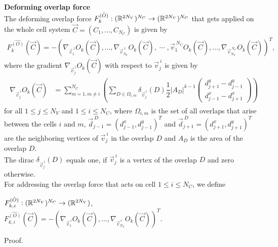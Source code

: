 \begin{proposition} \textbf{Deforming overlap force} \\
	The deforming overlap force $F_{k}^{\hat{(O)}}: (\mathbb{R}^{2 N_V})^{N_C} \rightarrow (\mathbb{R}^{2 N_V})^{N_C}$ that gets applied on the whole cell system $\vec{C} = (C_1, \ldots, C_{N_C})$ is given by  
	\begin{align*}
		F_{k}^{\hat{(O)}}(\vec{C}) 
		= - (\nabla_{\vec{v}_1^{\:1}} O_k(\vec{C}), \ldots, \nabla_{\vec{v}_{N_V}^{\:1}} O_k(\vec{C}), \; \cdots \;, \vec{v}_1^{\:N_C} O_k(\vec{C}), \ldots, \nabla_{\vec{v}_{N_V}^{\:N_C}} O_k(\vec{C}))^T,
	\end{align*}
	where the gradient $\nabla_{\vec{v}^{\:i}_j} O_k(\vec{C})$ with respect to $\vec{v}^{\:i}_j$ is given by 
	\begin{align}
		\begin{split}
			\nabla_{\vec{v}^{\:i}_j} O_k(\vec{C}) &= \sum\limits_{m=1, m \neq i}^{N_C} \left( \sum\limits_{D \in \Omega_{i,m}} \delta_{\vec{v}^{\:i}_j}(D) \dfrac{1}{2} |A_{D}|^{k-1} \begin{pmatrix} d_{j+1}^{y} - d_{j-1}^{y} \\[0.5em]  d_{j-1}^{x} - d_{j+1}^{x} \end{pmatrix} \right)
		\end{split}
		\label{gradient:overlap}
	\end{align}
	for all $1 \leq j \leq N_V$ and $1 \leq i \leq N_C$, where $\Omega_{i,m}$ is the set of all overlaps that arise between the cells $i$ and $m$, $\vec{d}_{j-1}^{\: D} = (d_{j-1}^{x}, d_{j-1}^{y})^T$ and $\vec{d}_{j+1}^{	\: D} = (d_{j+1}^{x}, d_{j+1}^{y})^T$ are the neighboring vertices of $\vec{v}^{\:i}_j$ in the overlap $D$ and $A_{D}$ is the area of the overlap $D$.\\
	The dirac $\delta_{\vec{v}^{\:i}_j}(D)$ equals one, if $\vec{v}^{\:i}_j$ is a vertex of the overlap $D$ and zero otherwise. \\
	For addressing the overlap force that acts on cell $1 \leq i \leq N_C$, we define 
	\begin{center}
		$F_{k, i}^{\hat{(O)}}: (\mathbb{R}^{2 N_V})^{N_C} \rightarrow (\mathbb{R}^{2 N_V})$, \\
		$F_{k, i}^{\hat{(O)}}(\vec{C}) = - (\nabla_{\vec{v}_1^{\:i}} O_k(\vec{C}), \ldots, \nabla_{\vec{v}_{N_V}^{\:i}} O_k(\vec{C}))^T$. 
	\end{center}
	

	Proof. \\
	

\end{proposition}
